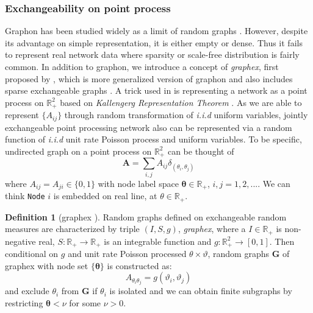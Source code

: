 \documentclass[12pt]{article}
\theoremstyle{definition}
\newtheorem{definition}{Definition}[section]
\begin{document}
\subsubsection{Exchangeability on point process}
	
Graphon has been studied widely as a limit of random graphs \citep{lovasz2006limits}. However, despite its advantage on simple representation, it is either empty or dense. Thus it fails to represent real network data where sparsity or scale-free distribution is fairly common. In addition to graphon, we introduce a concept of \textit{graphex}, first proposed by \cite{veitch2015class}, which is more generalized version of graphon and also includes sparse exchangeable graphs \citep{caron2014sparse}. A trick used in \cite{caron2014sparse} is representing a network as a point process on $\mathbb{R}^2_{+}$ based on \textit{Kallengerg Representation Theorem} \cite{kallenberg1990exchangeable}. As we are able to represent $\{ A_{ij} \}$ through random transformation of \textit{i.i.d} uniform variables, jointly exchangeable point processing network also can be represented via a random function of \textit{i.i.d} unit rate Poisson process and uniform variables. 
To be specific, undirected graph on a point process on $\mathbb{R}^2_{+}$ can be thought of 
\begin{equation}
\mathbf{A} = \sum\limits_{i,j} A_{ij} \delta_{( \theta_{i}, \theta_{j})} 
\end{equation}	
where $A_{ij} = A_{ji} \in \{ 0 , 1  \}$ with node label space $\mathbf{\theta} \in \mathbb{R}_{+}$, $i,j = 1,2,...$. We can think \texttt{Node} $i$ is embedded on real line, at $\theta \in \mathbb{R}_{+}$. 	
		
		
\begin{definition}[graphex \cite{kallenberg1990exchangeable}]
\label{graphex}
Random graphs defined on exchangeable random measures are characterized by triple $(I, S, g)$, \textit{graphex}, where a $I \in \mathbb{R}_{+}$ is non-negative real, $S : \mathbb{R}_{+ } \rightarrow \mathbb{R}_{+}$ is an integrable function and $g : \mathbb{R}^{2}_{+} \rightarrow [0,1]$. Then conditional on $g$ and unit rate Poisson processed $\theta \times \vartheta$, random graphs $\mathbf{G}$ of graphex with node set $\{ \mathbf{\theta} \}$ is constructed as:
\begin{equation}
A_{\theta_{i} \theta_{j}} = g(\vartheta_{i}, \vartheta_{j})
\end{equation}
and exclude $\theta_{i}$ from $\mathbf{G}$ if $\theta_{i}$ is isolated and we can obtain finite subgraphs by restricting $\mathbf{\theta}  < \nu$ for some $\nu > 0$.		
\end{definition}
	
\end{document}
